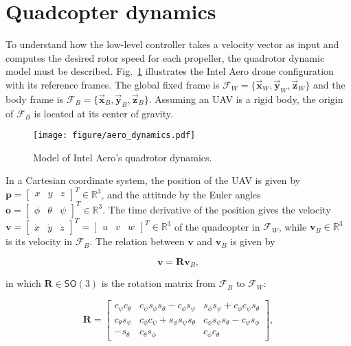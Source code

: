\section{Quadcopter dynamics}

To understand how the low-level controller takes a velocity vector as input
and computes the desired rotor speed for each propeller, the quadrotor dynamic
model must be described.
Fig.~\ref{fig:aero-dynamics} illustrates the Intel Aero drone configuration
with its reference frames. The global fixed frame is $\mathcal{F}_W =
\{\vec{\mathbf{x}}_W, \vec{\mathbf{y}}_W, \vec{\mathbf{z}}_W\}$ and the body
frame is $\mathcal{F}_B = \{\vec{\mathbf{x}}_B, \vec{\mathbf{y}}_B,
\vec{\mathbf{z}}_B\}$. Assuming an UAV is a rigid body, the origin of
$\mathcal{F}_B$ is located at its center of gravity. 

\begin{figure}[h!]
  \centering
  \texttt{[image: figure/aero\_dynamics.pdf]}
  \caption{Model of Intel Aero's quadrotor dynamics.}
  \label{fig:aero-dynamics}
\end{figure}

In a Cartesian coordinate system, the position of the UAV is given by 
$\mathbf{p} = \begin{bmatrix} x & y & z \end{bmatrix}^T \in \mathbb{R}^3$,
and the attitude by the Euler angles
$\mathbf{o} = \begin{bmatrix} \phi & \theta & \psi\end{bmatrix}^T \in
\mathbb{R}^3$.
The time derivative of the position gives the velocity
$\mathbf{v} = \begin{bmatrix}\dot{x} & \dot{y} & \dot{z}\end{bmatrix}^T =
\begin{bmatrix} u & v & w \end{bmatrix}^T \in \mathbb{R}^3$
of the quadcopter in 
$\mathcal{F}_W$, while $\mathbf{v}_B \in \mathbb{R}^3$
is its velocity in $\mathcal{F}_B$. The relation between
$\mathbf{v}$ and $\mathbf{v}_B$ is given by

\begin{equation}
  \mathbf{v} = \mathbf{R} \mathbf{v}_B,
  \label{eq:linear_velocity}
\end{equation}

in which $\mathbf{R} \in \mathsf{SO}(3)$ is the rotation matrix from
$\mathcal{F}_B$ to $\mathcal{F}_W$:

\begin{equation}
  \mathbf{R} = \begin{bmatrix}c_{\psi} c_{\theta} & c_{\psi} s_{\phi}
  s_{\theta} - c_{\phi} s_{\psi} & s_{\phi} s_{\psi} + c_{\phi} c_{\psi}
  s_{\theta} \\ c_{\theta} s_{\psi} & c_{\phi} c_{\psi} + s_{\phi} s_{\psi}
  s_{\theta} & c_{\phi} s_{\psi} s_{\theta} - c_{\psi} s_{\phi} \\ -s_{\theta} &
  c_{\theta} s_{\phi} & c_{\phi} c_{\theta}\end{bmatrix},
  \label{eq:rotation_matrix}
\end{equation}

